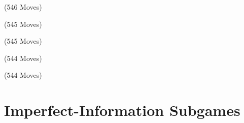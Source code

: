 \documentclass{beamer}
\theoremstyle{definition}
\begin{document}
{    \begin{frame}{\chessTitle (546 Moves)}
      \begin{figure}[H]
        \centering
        \showboard
      \end{figure}
    \end{frame}

    \begin{frame}{\chessTitle (545 Moves)}
      \begin{figure}[H]
        \centering
        \showboard
      \end{figure}
    \end{frame}

    \begin{frame}{\chessTitle (545 Moves)}
      \begin{figure}[H]
        \centering
        \showboard
      \end{figure}
    \end{frame}

    \begin{frame}{\chessTitle (544 Moves)}
      \begin{figure}[H]
        \centering
        \showboard
      \end{figure}
    \end{frame}

    \begin{frame}{\chessTitle (544 Moves)}
      \begin{figure}[H]
        \centering
        \showboard
      \end{figure}
      \pause
    \end{frame}
  }

  \section{Imperfect-Information Subgames}
\end{document}

